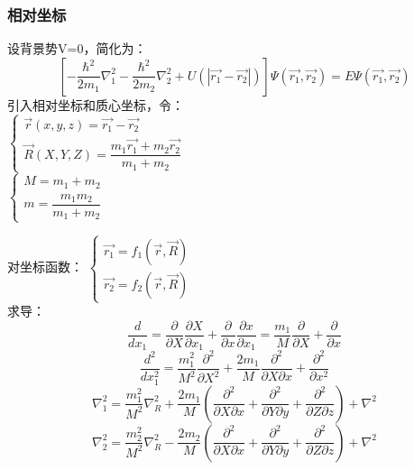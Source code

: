 \begin{frame}
	\frametitle{相对坐标}
	设背景势V=0，简化为：
	\begin{equation*}
		\left[-\frac{\hbar^2}{2 m_1} \nabla_1 ^2  -\frac{\hbar^2}{2 m_2} \nabla_2 ^2 +U(| \vec{r_1}-\vec{r_2} | ) \right] \Psi (\vec{r_1},\vec{r_2}) =E \Psi (\vec{r_1},\vec{r_2}) 
	\end{equation*}
	引入相对坐标和质心坐标，令：\\
	$\displaystyle \begin{cases}
		\vec{r} (x,y,z)= \vec{r_1}-\vec{r_2}   \\
		\vec{R} (X,Y,Z)= \dfrac{ m_1\vec{r_1}+ m_2\vec{r_2}  }{ m_1+m_2}
	\end{cases}$ \\	
	$\displaystyle \begin{cases}
		M= m_1+m_2   \\
		m = \dfrac{m_1m_2}{m_1+m_2}
	\end{cases}$ \\	
\end{frame}		

\begin{frame}
	对坐标函数：
	$\displaystyle \begin{cases}
		\vec{r_1}= f_1(\vec{r},\vec{R}) \\
		\vec{r_2}= f_2(\vec{r},\vec{R}) 
	\end{cases}$ \\	
	求导：
	\begin{equation*}
		\dfrac{d}{dx_1}= \dfrac{\partial}{\partial X}  \dfrac{\partial X}{ \partial x_1} +\dfrac{\partial }{\partial x}  \dfrac{\partial x}{\partial x_1} 
		= \dfrac{m_1}{M}  \dfrac{\partial }{ \partial X} +\dfrac{\partial }{\partial x} 
	\end{equation*}
	\begin{equation*}
		\dfrac{d^2}{dx^2 _1}= \dfrac{m^2 _1}{M^2 }  \dfrac{\partial^2 }{ \partial X^2} + \dfrac{2m _1}{M }  \dfrac{\partial^2 }{ \partial X \partial x}+\dfrac{\partial ^2 }{\partial x^2} 
	\end{equation*}
	\begin{equation*}
		\nabla ^2 _1= \dfrac{m^2 _1}{M^2 }  \nabla ^2 _R + \dfrac{2m _1}{M }  (\dfrac{\partial^2 }{ \partial X \partial x} +  \dfrac{\partial^2 }{ \partial Y \partial y} + \dfrac{\partial^2 }{ \partial Z \partial z})    + \nabla ^2 
	\end{equation*}
	\begin{equation*}
		\nabla ^2 _2= \dfrac{m^2 _2}{M^2 }  \nabla ^2 _R - \dfrac{2m _2}{M }  (\dfrac{\partial^2 }{ \partial X \partial x} +  \dfrac{\partial^2 }{ \partial Y \partial y} + \dfrac{\partial^2 }{ \partial Z \partial z})    + \nabla ^2 
	\end{equation*}
\end{frame}		

